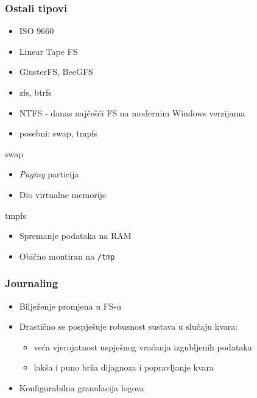 \documentclass[t]{beamer}
\begin{document}
\begin{frame}
	\frametitle{Ostali tipovi}
    \begin{itemize}
        \item ISO 9660
        \item Linear Tape FS
        \item GlusterFS, BeeGFS
        \item zfs, btrfs
		\item NTFS - danas najčešći FS na modernim Windows verzijama
        \item posebni: swap, tmpfs
    \end{itemize}

    swap
	\begin{itemize}
		\item \emph{Paging} particija
		\item Dio virtualne memorije
	\end{itemize}
	tmpfs
	\begin{itemize}
		\item Spremanje podataka na RAM
		\item Obično montiran na \texttt{/tmp}
	\end{itemize}
\end{frame}


\begin{frame}
	\frametitle{Journaling}
	\begin{itemize}
		\item Bilježenje promjena u FS-u
		\item Drastično se pospješuje robusnost sustava u slučaju kvara:
		\begin{itemize}
			\item veća vjerojatnost uspješnog vraćanja izgubljenih podataka
			\item lakša i puno brža dijagnoza i popravljanje kvara
		\end{itemize}
		\item Konfigurabilna granulacija logova
	\end{itemize}
\end{frame}
\end{document}
